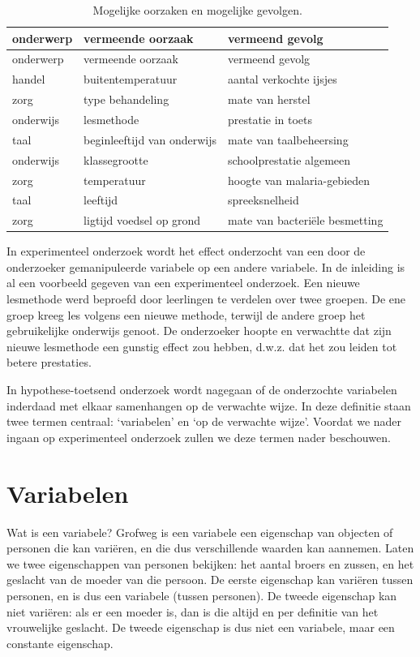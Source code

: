 \documentclass[
]{book}
\begin{document}
\begin{longtable}[]{@{}lll@{}}
\caption{\label{tab:oorzaakgevolg} Mogelijke oorzaken en mogelijke gevolgen.}\tabularnewline
\toprule
onderwerp & vermeende oorzaak & vermeend gevolg\tabularnewline
\midrule
\endfirsthead
\toprule
onderwerp & vermeende oorzaak & vermeend gevolg\tabularnewline
\midrule
\endhead
handel & buitentemperatuur & aantal verkochte ijsjes\tabularnewline
zorg & type behandeling & mate van herstel\tabularnewline
onderwijs & lesmethode & prestatie in toets\tabularnewline
taal & beginleeftijd van onderwijs & mate van taalbeheersing\tabularnewline
onderwijs & klassegrootte & schoolprestatie algemeen\tabularnewline
zorg & temperatuur & hoogte van malaria-gebieden\tabularnewline
taal & leeftijd & spreeksnelheid\tabularnewline
zorg & ligtijd voedsel op grond & mate van bacteriële besmetting\tabularnewline
\bottomrule
\end{longtable}

In experimenteel onderzoek wordt het effect onderzocht van een door de
onderzoeker gemanipuleerde variabele op een andere variabele. In de
inleiding is al een voorbeeld gegeven van een experimenteel onderzoek.
Een nieuwe lesmethode werd beproefd door leerlingen te verdelen over
twee groepen. De ene groep kreeg les volgens een nieuwe methode, terwijl
de andere groep het gebruikelijke onderwijs genoot. De onderzoeker
hoopte en verwachtte dat zijn nieuwe lesmethode een gunstig effect zou
hebben, d.w.z. dat het zou leiden tot betere prestaties.

In hypothese-toetsend onderzoek wordt nagegaan of de onderzochte
variabelen inderdaad met elkaar samenhangen op de verwachte wijze. In
deze definitie staan twee termen centraal: `variabelen' en `op de
verwachte wijze'. Voordat we nader ingaan op experimenteel onderzoek
zullen we deze termen nader beschouwen.

\hypertarget{sec:variabelen}{%
\section{Variabelen}\label{sec:variabelen}}

Wat is een variabele? Grofweg is een variabele een eigenschap van
objecten of personen die kan variëren, en die dus verschillende waarden
kan aannemen. Laten we twee eigenschappen van personen bekijken: het
aantal broers en zussen, en het geslacht van de moeder van die persoon.
De eerste eigenschap kan variëren tussen personen, en is dus een
variabele (tussen personen). De tweede eigenschap kan niet variëren: als
er een moeder is, dan is die altijd en per definitie van het vrouwelijke
geslacht. De tweede eigenschap is dus niet een variabele, maar een
constante eigenschap.
\end{document}
